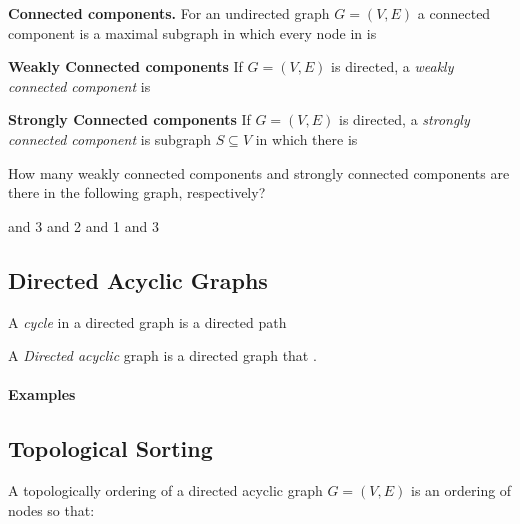\documentclass[11  pt]{exam}
\begin{document}
	
	\textbf{Connected components.} 
	For an undirected graph $G = (V,E)$ a connected component is a maximal subgraph in which every node in is  \\
	
	
	\vfill
	
	\textbf{Weakly Connected components} If $G = (V,E)$ is directed, a \emph{weakly connected component} is \\ %
	
	
	\vfill
	
	
	\textbf{Strongly Connected components} If $G = (V,E)$ is directed, a \emph{strongly connected component} is subgraph $S \subseteq V$ in which there is  \\ %
	\vfill 
	
	\newpage
	
	\begin{Qu}
		How many weakly connected components and strongly connected components are there in the following graph, respectively?
		
		\begin{itemize}
			 and 3
			 and 2
			 and 1
			 and 3
		\end{itemize}
		
	\end{Qu}
	
	
	\vs{3cm}
	
	\subsection{Directed Acyclic Graphs}
	A \emph{cycle} in a directed graph is a directed path  \\ %
	
	\vs{2cm}
	
	
	A \emph{Directed acyclic} graph is a directed graph that .
	
	
	\paragraph{Examples}
	
	
	
	\newpage
	
	
	\subsection{Topological Sorting}
	A topologically ordering of a directed acyclic graph $G = (V,E)$ is an ordering of nodes so that: \\
	
\end{document}
